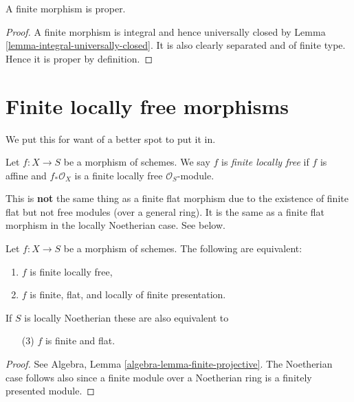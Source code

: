 \begin{lemma}
\label{lemma-finite-proper}
A finite morphism is proper.
\end{lemma}

\begin{proof}
A finite morphism is integral and hence universally closed by
Lemma \ref{lemma-integral-universally-closed}. It is also
clearly separated and of finite type. Hence it is proper by
definition.
\end{proof}










\section{Finite locally free morphisms}
\label{section-finite-locally-free}

\noindent
We put this for want of a better spot to put it in.

\begin{definition}
\label{definition-finite-locally-free}
Let $f : X \to S$ be a morphism of schemes.
We say $f$ is {\it finite locally free} if $f$ is
affine and $f_*\mathcal{O}_X$ is a finite locally
free $\mathcal{O}_S$-module.
\end{definition}

\noindent
This is {\bf not} the same thing as a finite flat morphism due to
the existence of finite flat but not free modules (over a general
ring). It is the same as a finite flat morphism in the locally
Noetherian case. See below.

\begin{lemma}
\label{lemma-finite-flat}
Let $f : X \to S$ be a morphism of schemes.
The following are equivalent:
\begin{enumerate}
\item $f$ is finite locally free,
\item $f$ is finite, flat, and locally of finite presentation.
\end{enumerate}
If $S$ is locally Noetherian these are also equivalent to
\begin{enumerate}
\item[(3)] $f$ is finite and flat.
\end{enumerate}
\end{lemma}

\begin{proof}
See Algebra, Lemma \ref{algebra-lemma-finite-projective}.
The Noetherian case follows also since a finite module
over a Noetherian ring is a finitely presented module.
\end{proof}

